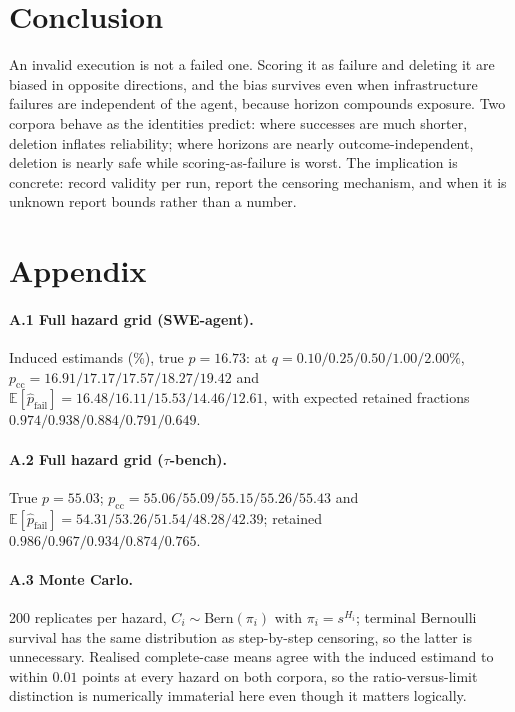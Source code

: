 \documentclass[letterpaper]{article}
\begin{document}
\section{Conclusion}

An invalid execution is not a failed one. Scoring it as failure and deleting it
are biased in opposite directions, and the bias survives even when
infrastructure failures are independent of the agent, because horizon compounds
exposure. Two corpora behave as the identities predict: where successes are much
shorter, deletion inflates reliability; where horizons are nearly
outcome-independent, deletion is nearly safe while scoring-as-failure is worst.
The implication is concrete: record validity per run, report the censoring
mechanism, and when it is unknown report bounds rather than a number.




\appendix
\section{Appendix}

\paragraph{A.1 Full hazard grid (SWE-agent).} Induced estimands (\%), true
$p=16.73$: at $q=0.10/0.25/0.50/1.00/2.00\%$, $p_{\mathrm{cc}}=
16.91/17.17/17.57/18.27/19.42$ and $\mathbb{E}[\hat p_{\mathrm{fail}}]=
16.48/16.11/15.53/14.46/12.61$, with expected retained fractions
$0.974/0.938/0.884/0.791/0.649$.

\paragraph{A.2 Full hazard grid ($\tau$-bench).} True $p=55.03$;
$p_{\mathrm{cc}}=55.06/55.09/55.15/55.26/55.43$ and
$\mathbb{E}[\hat p_{\mathrm{fail}}]=54.31/53.26/51.54/48.28/42.39$; retained
$0.986/0.967/0.934/0.874/0.765$.

\paragraph{A.3 Monte Carlo.} 200 replicates per hazard, $C_i\sim\mathrm{Bern}
(\pi_i)$ with $\pi_i=s^{H_i}$; terminal Bernoulli survival has the same
distribution as step-by-step censoring, so the latter is unnecessary. Realised
complete-case means agree with the induced estimand to within $0.01$ points at
every hazard on both corpora, so the ratio-versus-limit distinction is
numerically immaterial here even though it matters logically.
\end{document}
